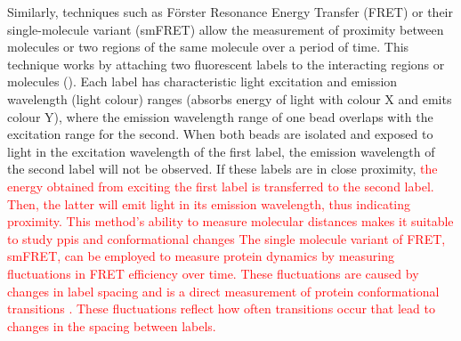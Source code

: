 Similarly, techniques such as Förster Resonance Energy Transfer (FRET) or their single-molecule variant (smFRET) allow the measurement of proximity between molecules or two regions of the same molecule over a period of time. This technique works by attaching two fluorescent labels to the interacting regions or molecules (). Each label has characteristic light excitation and emission wavelength (light colour) ranges (absorbs energy of light with colour X and emits colour Y), where the emission wavelength range of one bead overlaps with the excitation range for the second. When both beads are isolated and exposed to light in the excitation wavelength of the first label, the emission wavelength of the second label will not be observed. If these labels are in close proximity, \textcolor{red}{the energy obtained from exciting the first label is transferred to the second label. Then, the latter will emit light in its emission wavelength, thus indicating proximity. This method's ability to measure molecular distances makes it suitable to study \glspl{ppi} and conformational changes \cite{truong_use_2001, heyduk_measuring_2002}}
\textcolor{red}{The single molecule variant of FRET, smFRET, can be employed to measure protein dynamics by measuring fluctuations in FRET efficiency over time. These fluctuations are caused by changes in label spacing and is a direct measurement of protein conformational transitions \cite{weiss_measuring_2000}. These fluctuations reflect how often transitions occur that lead to changes in the spacing between labels.}

